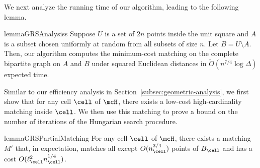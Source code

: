 


We next analyze the running time of our algorithm, leading to the following lemma.


\begin{restatable}{lemma}{GRSAnalysiss}\label{lemma:GRS-analysis-p2}
    Suppose $U$ is a set of $2n$ points inside the unit square and $A$ is a subset chosen uniformly at random from all subsets of size $n$. Let $B=U\setminus A$.  Then, our algorithm computes the minimum-cost matching on the complete bipartite graph on $A$ and $B$ under squared Euclidean distances in $\tilde{O}(n^{7/4}\log \Delta)$ expected time.
\end{restatable} 


Similar to our efficiency analysis in Section~\ref{subsec:geometric-analysis}, we first show that for any cell $\cell$ of $\mcH$, there exists a low-cost high-cardinality matching inside $\cell$. We then use this matching to prove a bound on the number of iterations of the Hungarian search procedure.






\begin{restatable}{lemma}{GRSPartialMatching}\label{lemma:GRS-matching}
    For any cell $\cell$ of $\mcH$, there exists a matching $M'$ that, in expectation, matches all except $O(n_\cell^{3/4})$ points of $B_\cell$ and has a cost $O(\ell_\cell^2 n_\cell^{1/4})$.
\end{restatable}










